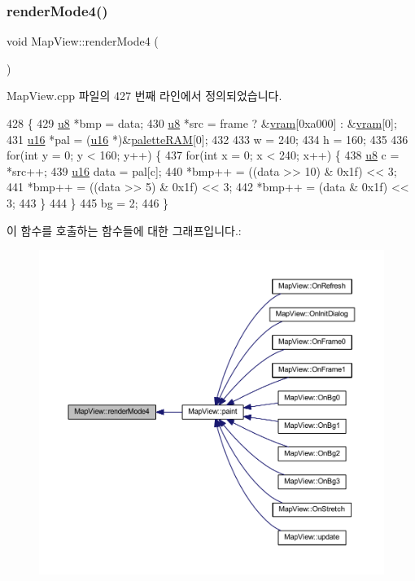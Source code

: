 \subsubsection{\texorpdfstring{render\+Mode4()}{renderMode4()}}
{\footnotesize\ttfamily void Map\+View\+::render\+Mode4 (\begin{DoxyParamCaption}{ }\end{DoxyParamCaption})}



Map\+View.\+cpp 파일의 427 번째 라인에서 정의되었습니다.


\begin{DoxyCode}
428 \{
429   \mbox{\hyperlink{_system_8h_aed742c436da53c1080638ce6ef7d13de}{u8}} *bmp = data;
430   \mbox{\hyperlink{_system_8h_aed742c436da53c1080638ce6ef7d13de}{u8}} *src = frame ? &\mbox{\hyperlink{_globals_8cpp_a983f8cd19ae66ea98e180c2e13bee5b9}{vram}}[0xa000] : &\mbox{\hyperlink{_globals_8cpp_a983f8cd19ae66ea98e180c2e13bee5b9}{vram}}[0];
431   \mbox{\hyperlink{_system_8h_a9e6c91d77e24643b888dbd1a1a590054}{u16}} *pal = (\mbox{\hyperlink{_system_8h_a9e6c91d77e24643b888dbd1a1a590054}{u16}} *)&\mbox{\hyperlink{_globals_8cpp_aea0283719ad27328f3cf5f883f58813e}{paletteRAM}}[0];
432   
433   w = 240;
434   h = 160;
435   
436   \textcolor{keywordflow}{for}(\textcolor{keywordtype}{int} y = 0; y < 160; y++) \{
437     \textcolor{keywordflow}{for}(\textcolor{keywordtype}{int} x = 0; x < 240; x++) \{
438       \mbox{\hyperlink{_system_8h_aed742c436da53c1080638ce6ef7d13de}{u8}} c = *src++;
439       \mbox{\hyperlink{_system_8h_a9e6c91d77e24643b888dbd1a1a590054}{u16}} data = pal[c];
440       *bmp++ = ((data >> 10) & 0x1f) << 3;
441       *bmp++ = ((data >> 5) & 0x1f) << 3;
442       *bmp++ = (data & 0x1f) << 3;      
443     \}
444   \}
445   bg = 2;
446 \}
\end{DoxyCode}
이 함수를 호출하는 함수들에 대한 그래프입니다.\+:
\nopagebreak
\begin{figure}[H]
\begin{center}
\leavevmode
\includegraphics[width=350pt]{class_map_view_a2e10ddf467ef8b43907459790c20016e_icgraph}
\end{center}
\end{figure}
